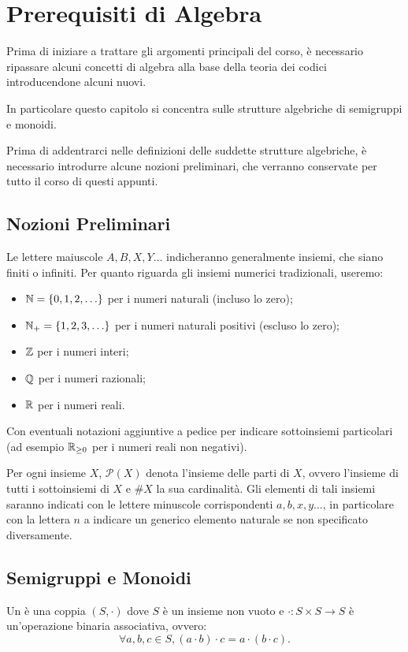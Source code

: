 \chapter{Prerequisiti di Algebra}

Prima di iniziare a trattare gli argomenti principali del corso,
è necessario ripassare alcuni concetti di algebra alla base della teoria dei codici introducendone alcuni nuovi.

In particolare questo capitolo si concentra sulle strutture algebriche di semigruppi e monoidi.

Prima di addentrarci nelle definizioni delle suddette strutture algebriche, è necessario introdurre alcune nozioni preliminari, che verranno conservate per tutto il corso di questi appunti.

\section{Nozioni Preliminari}

Le lettere maiuscole \(A, B, X, Y \ldots\) indicheranno generalmente insiemi, che siano finiti o infiniti.
Per quanto riguarda gli insiemi numerici tradizionali, useremo:
\begin{itemize}
  \item \(\N = \set{0,1,2,\ldots}\) per i numeri naturali (incluso lo zero);
  \item \(\N_+ = \set{1,2,3,\ldots}\) per i numeri naturali positivi (escluso lo zero);
  \item \(\mathbb{Z}\) per i numeri interi;
  \item \(\mathbb{Q}\) per i numeri razionali;
  \item \(\mathbb{R}\) per i numeri reali.
\end{itemize}
Con eventuali notazioni aggiuntive a pedice per indicare sottoinsiemi particolari (ad esempio \(\mathbb{R}_{\geq 0}\) per i numeri reali non negativi).

Per ogni insieme \(X\), \(\mathcal{P}(X)\) denota l'insieme delle parti di \(X\), ovvero l'insieme di tutti i sottoinsiemi di \(X\) e \(\#X\) la sua cardinalità.
Gli elementi di tali insiemi saranno indicati con le lettere minuscole corrispondenti \(a,b,x,y \ldots\), in particolare con la lettera \(n\) a indicare un generico elemento naturale se non specificato diversamente.

\section{Semigruppi e Monoidi}
\begin{definition}[Semigruppo]
  Un  è una coppia \((S, \cdot)\) dove \(S\) è un insieme non vuoto e \(\cdot : S \times S \to S\) è un'operazione binaria associativa, ovvero:
  \[\forall a,b,c \in S, (a \cdot b) \cdot c = a \cdot (b \cdot c).\]
\end{definition}

